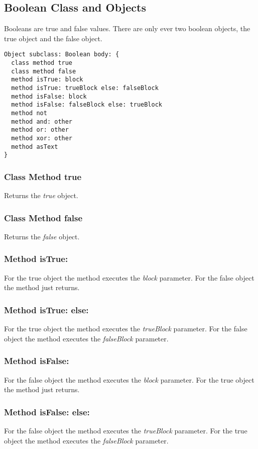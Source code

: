 \subsection {Boolean Class and Objects}

Booleans are true and false values. There are only ever two boolean objects, the true object and the false object.

\begin{lstlisting}
Object subclass: Boolean body: {
  class method true
  class method false
  method isTrue: block
  method isTrue: trueBlock else: falseBlock
  method isFalse: block
  method isFalse: falseBlock else: trueBlock
  method not
  method and: other
  method or: other
  method xor: other
  method asText
}
\end{lstlisting}

\subsubsection{Class Method true}
Returns the \textit{true} object.

\subsubsection{Class Method false}
Returns the \textit{false} object.

\subsubsection{Method isTrue:}
For the true object the method executes the \textit{block} parameter. For the false object the method just returns.

\subsubsection{Method isTrue: else:}
For the true object the method executes the \textit{trueBlock} parameter. For the false object the method executes the \textit{falseBlock} parameter.

\subsubsection{Method isFalse:}
For the false object the method executes the \textit{block} parameter. For the true object the method just returns.

\subsubsection{Method isFalse: else:}
For the false object the method executes the \textit{trueBlock} parameter. For the true object the method executes the \textit{falseBlock} parameter.


